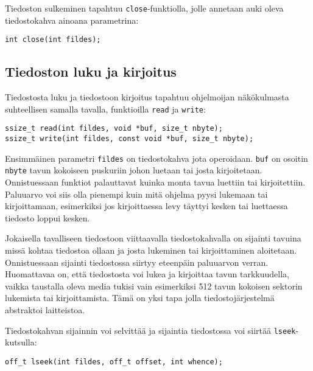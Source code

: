 Tiedoston sulkeminen tapahtuu \texttt{close}-funktiolla,
jolle annetaan auki oleva tiedostokahva ainoana parametrina:

\begin{verbatim}
int close(int fildes);
\end{verbatim}

\subsection{Tiedoston luku ja kirjoitus}

Tiedostosta luku ja tiedostoon kirjoitus tapahtuu ohjelmoijan näkökulmasta suhteellisen
samalla tavalla, funktioilla \texttt{read} ja \texttt{write}:

\begin{verbatim}
ssize_t read(int fildes, void *buf, size_t nbyte);
ssize_t write(int fildes, const void *buf, size_t nbyte);
\end{verbatim}

Ensimmäinen parametri \texttt{fildes} on tiedostokahva jota operoidaan.
\texttt{buf} on osoitin \texttt{nbyte} tavun kokoiseen puskuriin johon
luetaan tai josta kirjoitetaan.
Onnistuessaan funktiot palauttavat kuinka monta tavua luettiin tai kirjoitettiin.
Paluuarvo voi siis olla pienempi kuin mitä ohjelma pyysi lukemaan tai kirjoittamaan,
esimerkiksi jos kirjoittaessa levy täyttyi kesken tai luettaessa
tiedosto loppui kesken.

Jokaisella tavalliseen tiedostoon viittaavalla tiedostokahvalla on
sijainti tavuina missä kohtaa tiedostoa ollaan ja josta
lukeminen tai kirjoittaminen aloitetaan.
Onnistuessaan sijainti tiedostossa siirtyy eteenpäin paluuarvon verran.
Huomattavaa on, että tiedostosta voi lukea ja kirjoittaa tavun tarkkuudella,
vaikka taustalla oleva media tukisi vain esimerkiksi 512 tavun kokoisen sektorin lukemista tai kirjoittamista.
Tämä on yksi tapa jolla tiedostojärjestelmä abstraktoi laitteistoa.

Tiedostokahvan sijainnin voi selvittää ja sijaintia tiedostossa voi
siirtää \texttt{lseek}-kutsulla:

\begin{verbatim}
off_t lseek(int fildes, off_t offset, int whence);
\end{verbatim}

